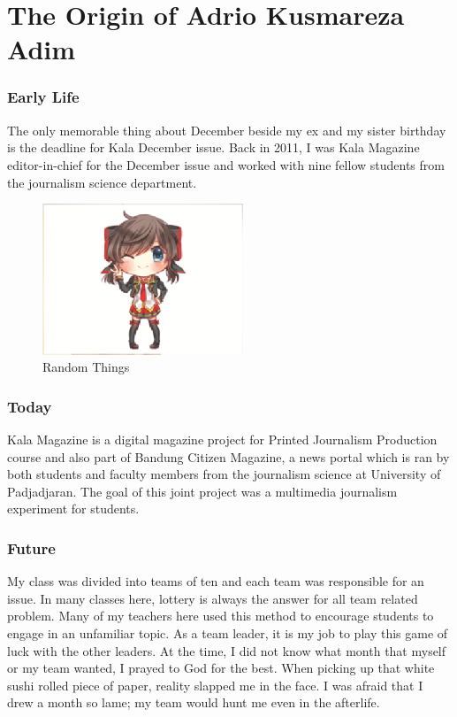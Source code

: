 \documentclass{article}
\begin{document}
\part{The Origin of Adrio Kusmareza Adim}
\section{Early Life}
The only memorable thing about December beside my ex and my sister birthday is the deadline for Kala December issue. Back in 2011, I was Kala Magazine editor-in-chief for the December issue and worked with nine fellow students from the journalism science department. \cite{einstein}

\begin{figure}[htb]
	\begin{center}
		\includegraphics[width=6.0cm]{adrio.eps}
		\caption{Random Things}
		\label{fig:figure1}
	\end{center}
\end{figure}

\section{Today}
Kala Magazine is a digital magazine project for Printed Journalism Production course and also part of Bandung Citizen Magazine, a news portal which is ran by both students and faculty members from the journalism science at University of Padjadjaran. The goal of this joint project was a multimedia journalism experiment for students. \cite{latexcompanion}

\section{Future}
My class was divided into teams of ten and each team was responsible for an issue. In many classes here, lottery is always the answer for all team related problem. Many of my teachers here used this method to encourage students to engage in an unfamiliar topic. As a team leader, it is my job to play this game of luck with the other leaders. At the time, I did not know what month that myself or my team wanted, I prayed to God for the best. When picking up that white sushi rolled piece of paper, reality slapped me in the face. I was afraid that I drew a month so lame; my team would hunt me even in the afterlife. \cite{knuthwebsite}
\end{document}
